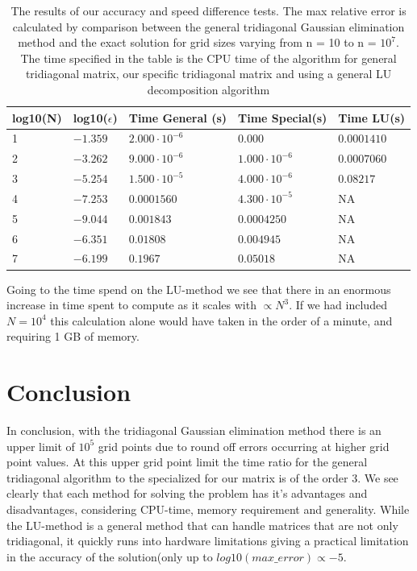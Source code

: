 \documentclass[a4paper,11pt]{article}
\begin{document}
{\begin{table}[H]
	\centering
	\caption{The results of our accuracy and speed difference tests. The max relative error is calculated by comparison between the general tridiagonal Gaussian elimination method and the exact solution for grid sizes varying from n = 10 to n = $10^{7}$. The time specified in the table is the CPU time of the algorithm for general tridiagonal matrix, our specific tridiagonal matrix and using a general LU decomposition algorithm}
	\label{table:Results}
	\begin{tabular}{|lllll|} \hline
		log10(N) & log10($\epsilon$) & Time General (s)     & Time Special(s)      & Time LU(s) \\
		\hline 
		1        & $-1.359$       &$2.000\cdot 10^{-6}$  &$0.000$              &  $0.0001410$    \\
		2        & $-3.262$       &$9.000\cdot 10^{-6}$  &$1.000\cdot 10^{-6}$ &  $0.0007060$        \\
		3        & $-5.254$       &$1.500\cdot 10^{-5}$  &$4.000\cdot 10^{-6}$ &  $0.08217$      \\
		4        & $-7.253$       &$0.0001560$ 	         &$4.300\cdot 10^{-5}$ &   NA       \\
		5        & $-9.044$       &$0.001843$	         &$0.0004250$	       &   NA       \\
		6        & $-6.351$       &$0.01808$	         &$0.004945$	       &   NA       \\
		7 	     & $-6.199$		  &$0.1967$ 		     &$0.05018$ 		   &   NA \\
		\hline
	\end{tabular}
\end{table}


		
		
Going to the time spend on the LU-method we see that there in an enormous increase in time spent to compute as it scales with $\propto N^3$. If we had included $N=10^4$ this calculation alone would have taken in the order of a minute, and requiring 1 GB of memory. 

\section*{Conclusion}
		
In conclusion, with the tridiagonal Gaussian elimination method there is an upper limit of $10^{5}$ grid points due to round off errors occurring at higher grid point values. At this upper grid point limit the time ratio for the general tridiagonal algorithm to the specialized for our matrix is of the order 3. We see clearly that each method for solving the problem has it's advantages and disadvantages, considering CPU-time, memory requirement and generality. While the LU-method is a general method that can handle matrices that are not only tridiagonal, it quickly runs into hardware limitations giving a practical limitation in the accuracy of the solution(only up to $log10(max\_error)\propto -5$. 
		
}
\end{document}

